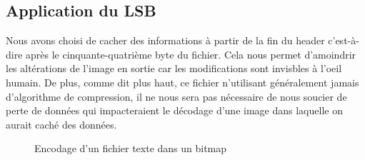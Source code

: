 \subsection{Application du LSB}
Nous avons choisi de cacher des informations à partir de la fin du header c'est-à-dire après le cinquante-quatrième byte du fichier.
Cela nous permet d'amoindrir les altérations de l'image en sortie car les modifications sont invisbles à l'oeil humain.
De plus, comme dit plus haut, ce fichier n'utilisant généralement jamais d'algorithme de compression, il ne nous sera pas nécessaire
de nous soucier de perte de données qui impacteraient le décodage d'une image dans laquelle on aurait caché des données.

\vspace{1.5cm}

\begin{figure}[H]
    \centering
    \hfill
    \caption{Encodage d'un fichier texte dans un bitmap}
\end{figure}